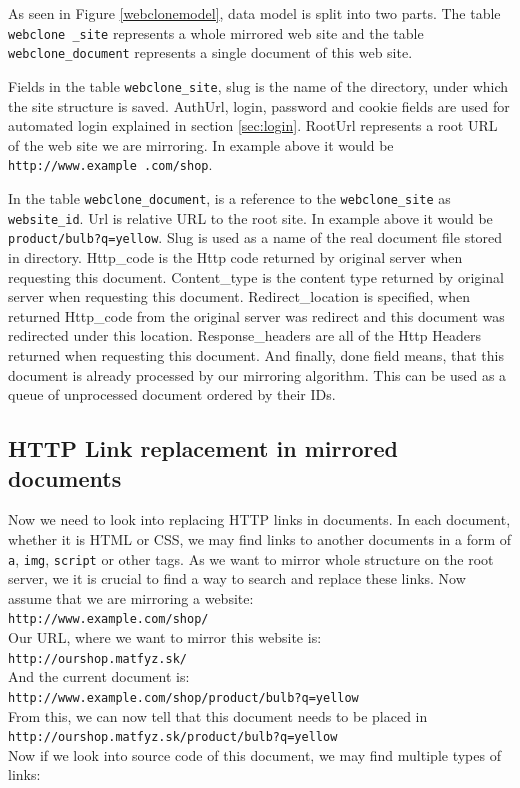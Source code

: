 As seen in Figure \ref{webclonemodel}, data model is split into two parts. The table \texttt{webclone \_site} represents a whole mirrored web site and the table \texttt{webclone\_document} represents a single document of this web site.

Fields in the table \texttt{webclone\_site}, slug is the name of the directory, under which the site structure is saved. AuthUrl, login, password and cookie fields are used for automated login explained in section \ref{sec:login}. RootUrl represents a root URL of the web site we are mirroring. In example above it would be \texttt{http://www.example .com/shop}.

In the table \texttt{webclone\_document}, is a reference to the \texttt{webclone\_site} as \texttt{website\_id}. Url is relative URL to the root site. In example above it would be \texttt{product/bulb?q=yellow}. Slug is used as a name of the real document file stored in directory. Http\_code is the Http code returned by original server when requesting this document. Content\_type is the content type returned by original server when requesting this document. Redirect\_location is specified, when returned Http\_code from the original server was redirect and this document was redirected under this location. Response\_headers are all of the Http Headers returned when requesting this document. And finally, done field means, that this document is already processed by our mirroring algorithm. This can be used as a queue of unprocessed document ordered by their IDs.

\subsection{HTTP Link replacement in mirrored documents}
\label{sec:linkReplace}
Now we need to look into replacing HTTP links in documents. In each document, whether it is HTML or CSS, we may find links to another documents in a form of \texttt{a}, \texttt{img}, \texttt{script} or other tags. As we want to mirror whole structure on the root server, we it is crucial to find a way to search and replace these links.
Now assume that we are mirroring a website: \\
\texttt{http://www.example.com/shop/} \\
Our URL, where  we want to mirror this website is: \\
\texttt{http://ourshop.matfyz.sk/} \\
And the current document is: \\
\texttt{http://www.example.com/shop/product/bulb?q=yellow} \\
From this, we can now tell that this document needs to be placed in \\
\texttt{http://ourshop.matfyz.sk/product/bulb?q=yellow} \\
Now if we look into source code of this document, we may find multiple types of links:

